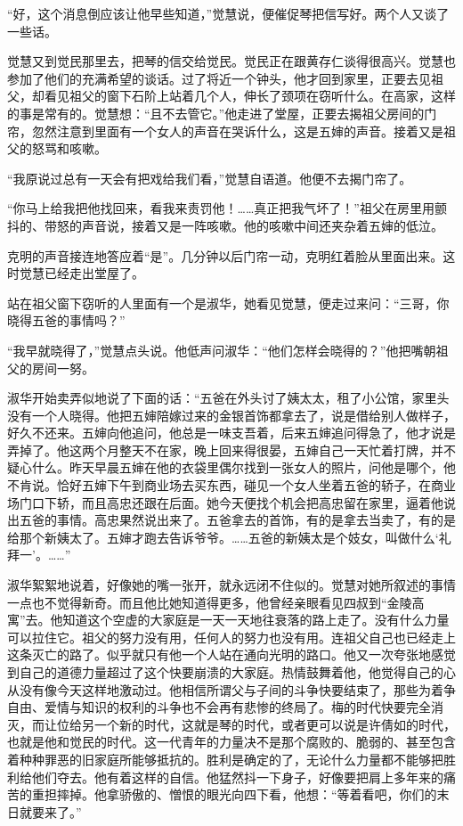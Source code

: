 \par “好，这个消息倒应该让他早些知道，”觉慧说，便催促琴把信写好。两个人又谈了一些话。
\par 觉慧又到觉民那里去，把琴的信交给觉民。觉民正在跟黄存仁谈得很高兴。觉慧也参加了他们的充满希望的谈话。过了将近一个钟头，他才回到家里，正要去见祖父，却看见祖父的窗下石阶上站着几个人，伸长了颈项在窃听什么。在高家，这样的事是常有的。觉慧想：“且不去管它。”他走进了堂屋，正要去揭祖父房间的门帘，忽然注意到里面有一个女人的声音在哭诉什么，这是五婶的声音。接着又是祖父的怒骂和咳嗽。
\par “我原说过总有一天会有把戏给我们看，”觉慧自语道。他便不去揭门帘了。
\par “你马上给我把他找回来，看我来责罚他！……真正把我气坏了！”祖父在房里用颤抖的、带怒的声音说，接着又是一阵咳嗽。他的咳嗽中间还夹杂着五婶的低泣。
\par 克明的声音接连地答应着“是”。几分钟以后门帘一动，克明红着脸从里面出来。这时觉慧已经走出堂屋了。
\par 站在祖父窗下窃听的人里面有一个是淑华，她看见觉慧，便走过来问：“三哥，你晓得五爸的事情吗？”
\par “我早就晓得了，”觉慧点头说。他低声问淑华：“他们怎样会晓得的？”他把嘴朝祖父的房间一努。
\par 淑华开始卖弄似地说了下面的话：“五爸在外头讨了姨太太，租了小公馆，家里头没有一个人晓得。他把五婶陪嫁过来的金银首饰都拿去了，说是借给别人做样子，好久不还来。五婶向他追问，他总是一味支吾着，后来五婶追问得急了，他才说是弄掉了。他这两个月整天不在家，晚上回来得很晏，五婶自己一天忙着打牌，并不疑心什么。昨天早晨五婶在他的衣袋里偶尔找到一张女人的照片，问他是哪个，他不肯说。恰好五婶下午到商业场去买东西，碰见一个女人坐着五爸的轿子，在商业场门口下轿，而且高忠还跟在后面。她今天便找个机会把高忠留在家里，逼着他说出五爸的事情。高忠果然说出来了。五爸拿去的首饰，有的是拿去当卖了，有的是给那个新姨太了。五婶才跑去告诉爷爷。……五爸的新姨太是个妓女，叫做什么‘礼拜一’。……”
\par 淑华絮絮地说着，好像她的嘴一张开，就永远闭不住似的。觉慧对她所叙述的事情一点也不觉得新奇。而且他比她知道得更多，他曾经亲眼看见四叔到“金陵高寓”去。他知道这个空虚的大家庭是一天一天地往衰落的路上走了。没有什么力量可以拉住它。祖父的努力没有用，任何人的努力也没有用。连祖父自己也已经走上这条灭亡的路了。似乎就只有他一个人站在通向光明的路口。他又一次夸张地感觉到自己的道德力量超过了这个快要崩溃的大家庭。热情鼓舞着他，他觉得自己的心从没有像今天这样地激动过。他相信所谓父与子间的斗争快要结束了，那些为着争自由、爱情与知识的权利的斗争也不会再有悲惨的终局了。梅的时代快要完全消灭，而让位给另一个新的时代，这就是琴的时代，或者更可以说是许倩如的时代，也就是他和觉民的时代。这一代青年的力量决不是那个腐败的、脆弱的、甚至包含着种种罪恶的旧家庭所能够抵抗的。胜利是确定的了，无论什么力量都不能够把胜利给他们夺去。他有着这样的自信。他猛然抖一下身子，好像要把肩上多年来的痛苦的重担摔掉。他拿骄傲的、憎恨的眼光向四下看，他想：“等着看吧，你们的末日就要来了。”

